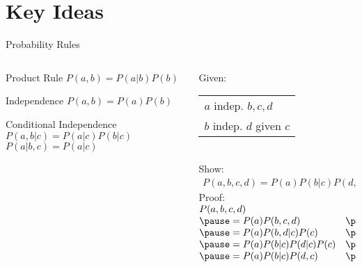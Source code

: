 \documentclass[14pt]{beamer}
\begin{document}
\part{Key Ideas}
\begin{frame}{Probability Rules}
	\begin{columns}
		\begin{column}{2in}
			\begin{block}{Product Rule}
				$P(a,b) = P(a|b)P(b)$
			\end{block}
			\begin{block}{Independence}
				$P(a,b) = P(a)P(b)$
			\end{block}
			\begin{block}{Conditional Independence}
				$P(a,b|c) = P(a|c)P(b|c)$ \\
				$P(a|b,c) = P(a|c)$ \\
			\end{block}
		\end{column}
		\pause
		\begin{column}{2.4in}
			\small
			Given: 
			\begin{tabular}[t]{l}
				$a$ indep. $b,c,d$ \\
				$b$ indep. $d$ given $c$
			\end{tabular}
			\\ \smallskip
			Show:
			\\ \smallskip
			$
			\begin{array}{l}
				P(a,b,c,d) = P(a)P(b|c)P(d,c)
			\end{array}
			$
			\\ \bigskip
			\pause
			Proof:
			\\ \smallskip
			$
			\begin{array}{@{}ll@{}}
			\lefteqn{P(a,b,c,d)} \\
			\pause = P(a)P(b,c,d)         & \pause\mbox{Indep.} \\
			\pause = P(a)P(b,d|c)P(c)     & \pause\mbox{Product} \\
			\pause = P(a)P(b|c)P(d|c)P(c) & \pause\mbox{Cond.} \\
			\pause = P(a)P(b|c)P(d,c)     & \pause\mbox{Product} \\
			\end{array}
			$
		\end{column}
	\end{columns}
\end{frame}
\end{document}
